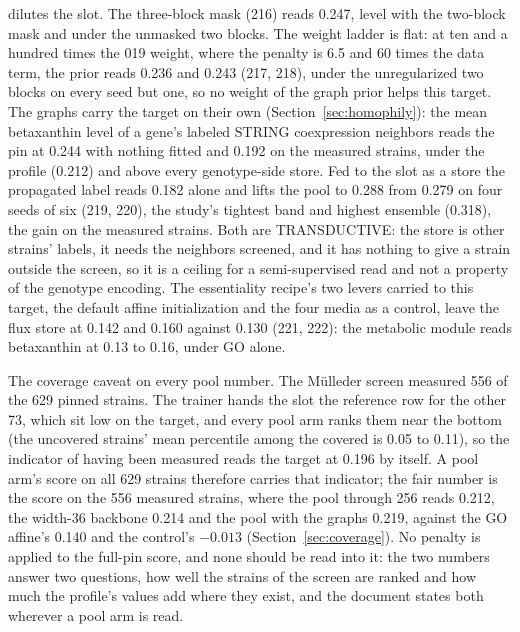 dilutes the slot. The three-block mask (216) reads 0.247, level with
the two-block mask and under the unmasked two blocks. The weight ladder is flat: at ten
and a hundred times the 019 weight, where the penalty is 6.5 and 60 times the data
term, the prior reads 0.236 and 0.243 (217, 218), under the unregularized two blocks on
every seed but one, so no weight of the graph prior helps this target. The graphs carry
the target on their own (Section~\ref{sec:homophily}): the mean betaxanthin level of a
gene's labeled STRING coexpression neighbors reads the pin at 0.244 with nothing fitted
and 0.192 on the measured strains, under the profile (0.212) and above every
genotype-side store. Fed to the slot as a store the propagated label reads 0.182 alone
and lifts the pool to 0.288 from 0.279 on four seeds of six (219, 220), the study's
tightest band and highest ensemble (0.318), the gain on the measured strains. Both are
TRANSDUCTIVE: the store is other strains' labels, it needs the neighbors screened, and
it has nothing to give a strain outside the screen, so it is a ceiling for a
semi-supervised read and not a property of the genotype encoding. The essentiality
recipe's two levers carried to this target, the default affine initialization and the
four media as a control, leave the flux store at 0.142 and 0.160 against 0.130 (221,
222): the metabolic module reads betaxanthin at 0.13 to 0.16, under GO alone.

The coverage caveat on every pool number. The M\"ulleder screen measured 556 of the 629
pinned strains. The trainer hands the slot the reference row for the other 73, which
sit low on the target, and every pool arm ranks them near the bottom (the uncovered
strains' mean percentile among the covered is 0.05 to 0.11), so the indicator of
having been measured reads the target at 0.196 by itself. A pool arm's score on all
629 strains therefore carries that indicator; the fair number is the score on the 556
measured strains, where the pool through 256 reads 0.212, the width-36 backbone 0.214
and the pool with the graphs 0.219, against the GO affine's 0.140 and the control's
$-0.013$ (Section~\ref{sec:coverage}). No penalty is applied to the full-pin score, and
none should be read into it: the two numbers answer two questions, how well the strains
of the screen are ranked and how much the profile's values add where they exist, and
the document states both wherever a pool arm is read.

